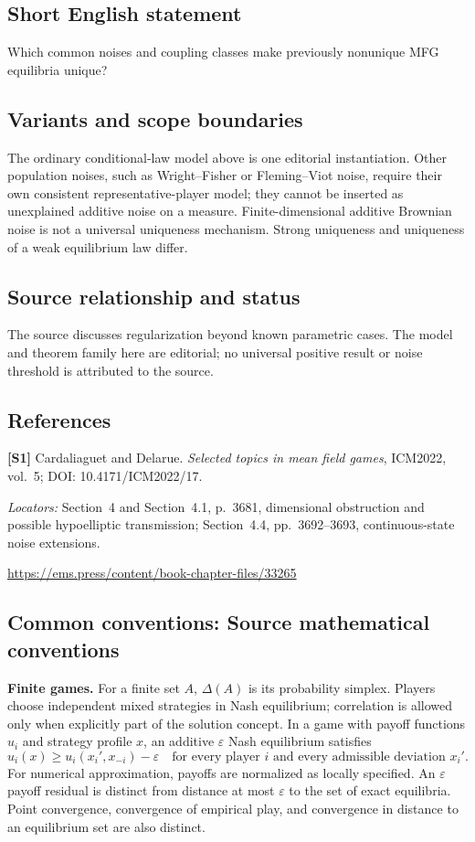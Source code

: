 \documentclass[11pt,a4paper]{article}
\begin{document}
\subsection*{Short English statement}
Which common noises and coupling classes make previously nonunique MFG equilibria unique?
\subsection*{Variants and scope boundaries}
The ordinary conditional-law model above is one editorial instantiation. Other population noises, such as Wright--Fisher or Fleming--Viot noise, require their own consistent representative-player model; they cannot be inserted as unexplained additive noise on a measure. Finite-dimensional additive Brownian noise is not a universal uniqueness mechanism. Strong uniqueness and uniqueness of a weak equilibrium law differ.
\subsection*{Source relationship and status}
The source discusses regularization beyond known parametric cases. The model and theorem family here are editorial; no universal positive result or noise threshold is attributed to the source.
\subsection*{References}
\begingroup\footnotesize\raggedright
{\footnotesize\raggedright
\textbf{[S1]} Cardaliaguet and Delarue. \emph{Selected topics in mean field games}, ICM2022, vol.~5; DOI: 10.4171/ICM2022/17.\par
\textit{Locators:} Section~4 and Section~4.1, p.~3681, dimensional obstruction and possible hypoelliptic transmission; Section~4.4, pp.~3692--3693, continuous-state noise extensions.\par
\url{https://ems.press/content/book-chapter-files/33265}\par}
\par\endgroup

\subsection*{Common conventions: Source mathematical conventions}

\textbf{Finite games.} For a finite set $A$, $\Delta(A)$ is its probability
simplex. Players choose independent mixed strategies in Nash equilibrium;
correlation is allowed only when explicitly part of the solution concept.
In a game with payoff functions $u_i$ and strategy profile $x$, an additive
$\varepsilon$ Nash equilibrium satisfies
\[
 u_i(x)\geq u_i(x_i',x_{-i})-\varepsilon
 \quad\text{for every player $i$ and every admissible deviation $x_i'$}.
\]
For numerical approximation, payoffs are normalized as locally specified.
An $\varepsilon$ payoff residual is distinct from distance at most
$\varepsilon$ to the set of exact equilibria. Point convergence, convergence
of empirical play, and convergence in distance to an equilibrium set are
also distinct.
\end{document}
